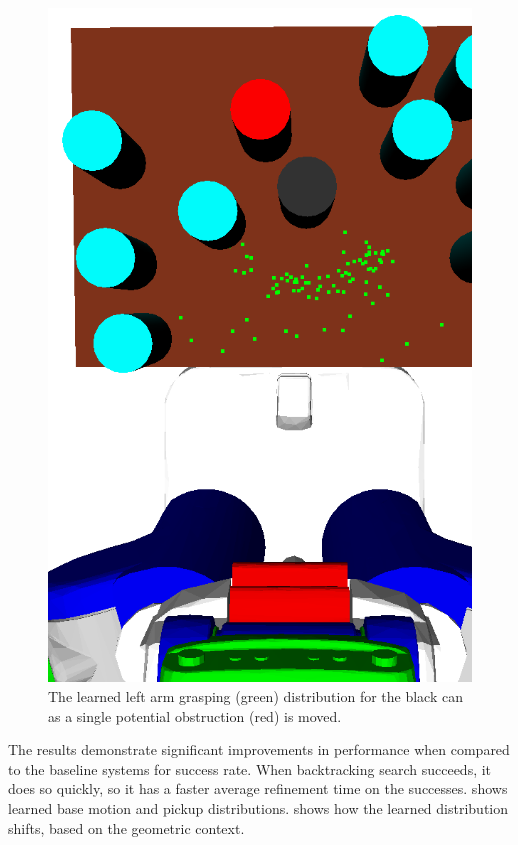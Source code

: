 \begin{figure}[t]
    \includegraphics[scale=0.13]{images/grasp_context_3.png}
  \caption{\small{The learned left arm grasping (green) distribution
      for the black can as a single potential obstruction (red) is
      moved.}}
  \label{fig:context}
\end{figure}

The results demonstrate significant improvements in performance when
compared to the baseline systems for success rate. When backtracking
search succeeds, it does so quickly, so it has a faster average
refinement time on the successes.  shows learned
base motion and pickup distributions.  shows how
the learned distribution shifts, based on the geometric context.

